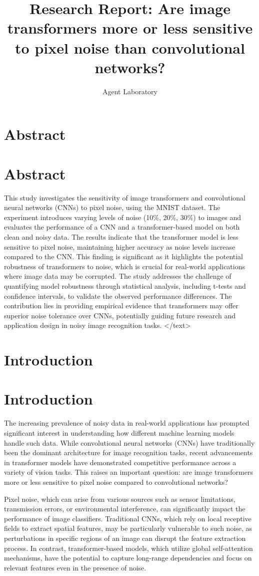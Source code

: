 \documentclass{article}
\title{Research Report: Are image transformers more or less sensitive to pixel noise than convolutional networks?}
\author{Agent Laboratory}
\begin{document}
\maketitle
\section{Abstract}
\section*{Abstract}
This study investigates the sensitivity of image transformers and convolutional neural networks (CNNs) to pixel noise, using the MNIST dataset. The experiment introduces varying levels of noise (10\%, 20\%, 30\%) to images and evaluates the performance of a CNN and a transformer-based model on both clean and noisy data. The results indicate that the transformer model is less sensitive to pixel noise, maintaining higher accuracy as noise levels increase compared to the CNN. This finding is significant as it highlights the potential robustness of transformers to noise, which is crucial for real-world applications where image data may be corrupted. The study addresses the challenge of quantifying model robustness through statistical analysis, including t-tests and confidence intervals, to validate the observed performance differences. The contribution lies in providing empirical evidence that transformers may offer superior noise tolerance over CNNs, potentially guiding future research and application design in noisy image recognition tasks.
</text>
\section{Introduction}
\section*{Introduction}

The increasing prevalence of noisy data in real-world applications has prompted significant interest in understanding how different machine learning models handle such data. While convolutional neural networks (CNNs) have traditionally been the dominant architecture for image recognition tasks, recent advancements in transformer models have demonstrated competitive performance across a variety of vision tasks. This raises an important question: are image transformers more or less sensitive to pixel noise compared to convolutional networks?

Pixel noise, which can arise from various sources such as sensor limitations, transmission errors, or environmental interference, can significantly impact the performance of image classifiers. Traditional CNNs, which rely on local receptive fields to extract spatial features, may be particularly vulnerable to such noise, as perturbations in specific regions of an image can disrupt the feature extraction process. In contrast, transformer-based models, which utilize global self-attention mechanisms, have the potential to capture long-range dependencies and focus on relevant features even in the presence of noise.
\end{document}
